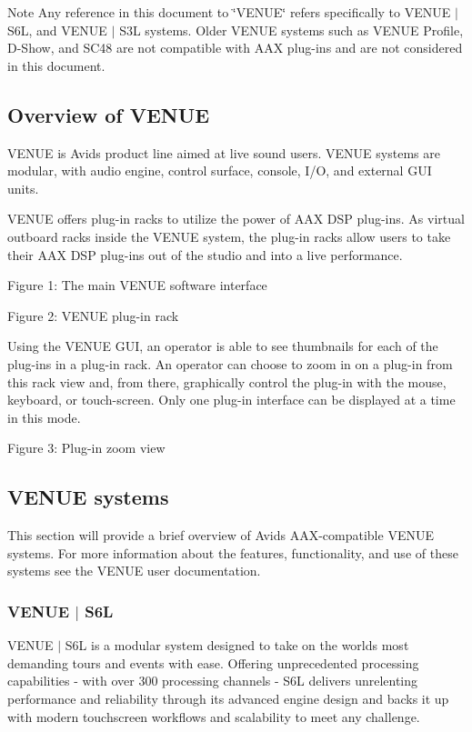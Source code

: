 \begin{DoxyNote}{Note}
Any reference in this document to \char`\"{}\+V\+E\+N\+U\+E\char`\"{} refers specifically to V\+E\+N\+UE $\vert$ S6L, and V\+E\+N\+UE $\vert$ S3L systems. Older V\+E\+N\+UE systems such as V\+E\+N\+UE Profile, D-\/\+Show, and S\+C48 are not compatible with A\+AX plug-\/ins and are not considered in this document.
\end{DoxyNote}


 \hypertarget{a00849_aax_venue_guide__overview}{}\subsection{Overview of V\+E\+N\+UE}\label{a00849_aax_venue_guide__overview}
 V\+E\+N\+UE is Avid\textquotesingle{}s product line aimed at live sound users. V\+E\+N\+UE systems are modular, with audio engine, control surface, console, I/O, and external G\+UI units.

 V\+E\+N\+UE offers plug-\/in racks to utilize the power of A\+AX D\+SP plug-\/ins. As virtual outboard racks inside the V\+E\+N\+UE system, the plug-\/in racks allow users to take their A\+AX D\+SP plug-\/ins out of the studio and into a live performance.

  Figure 1\+: The main V\+E\+N\+UE software interface

  Figure 2\+: V\+E\+N\+UE plug-\/in rack

 Using the V\+E\+N\+UE G\+UI, an operator is able to see thumbnails for each of the plug-\/ins in a plug-\/in rack. An operator can choose to zoom in on a plug-\/in from this rack view and, from there, graphically control the plug-\/in with the mouse, keyboard, or touch-\/screen. Only one plug-\/in interface can be displayed at a time in this mode.

  Figure 3\+: Plug-\/in zoom view



 \hypertarget{a00849_aax_venue_guide__systems}{}\subsection{V\+E\+N\+U\+E systems}\label{a00849_aax_venue_guide__systems}
 This section will provide a brief overview of Avid\textquotesingle{}s A\+A\+X-\/compatible V\+E\+N\+UE systems. For more information about the features, functionality, and use of these systems see the V\+E\+N\+UE user documentation.

\hypertarget{a00849_aax_venue_guide__systems__s6l}{}\subsubsection{V\+E\+N\+U\+E $\vert$ S6L}\label{a00849_aax_venue_guide__systems__s6l}
 V\+E\+N\+UE $\vert$ S6L is a modular system designed to take on the world\textquotesingle{}s most demanding tours and events with ease. Offering unprecedented processing capabilities -\/ with over 300 processing channels -\/ S6L delivers unrelenting performance and reliability through its advanced engine design and backs it up with modern touchscreen workflows and scalability to meet any challenge.

